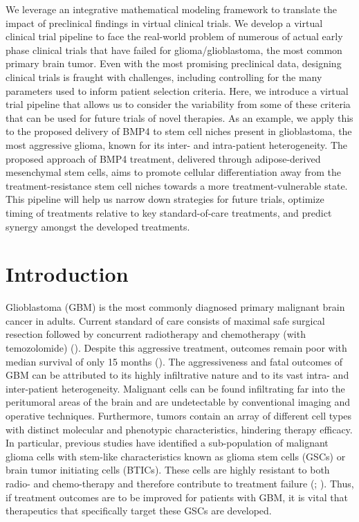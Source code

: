\documentclass[
  letterpaper,
]{scrreprt}
\theoremstyle{definition}
\theoremstyle{remark}
\begin{document}
We leverage an integrative mathematical modeling framework to translate
the impact of preclinical findings in virtual clinical trials. We
develop a virtual clinical trial pipeline to face the real-world problem
of numerous of actual early phase clinical trials that have failed for
glioma/glioblastoma, the most common primary brain tumor. Even with the
most promising preclinical data, designing clinical trials is fraught
with challenges, including controlling for the many parameters used to
inform patient selection criteria. Here, we introduce a virtual trial
pipeline that allows us to consider the variability from some of these
criteria that can be used for future trials of novel therapies. As an
example, we apply this to the proposed delivery of BMP4 to stem cell
niches present in glioblastoma, the most aggressive glioma, known for
its inter- and intra-patient heterogeneity. The proposed approach of
BMP4 treatment, delivered through adipose-derived mesenchymal stem
cells, aims to promote cellular differentiation away from the
treatment-resistance stem cell niches towards a more
treatment-vulnerable state. This pipeline will help us narrow down
strategies for future trials, optimize timing of treatments relative to
key standard-of-care treatments, and predict synergy amongst the
developed treatments.

\hfill\break

\section{Introduction}\label{sec-introduction}

Glioblastoma (GBM) is the most commonly diagnosed primary malignant
brain cancer in adults. Current standard of care consists of maximal
safe surgical resection followed by concurrent radiotherapy and
chemotherapy (with temozolomide) (). Despite this aggressive treatment, outcomes remain poor with
median survival of only 15 months (). The aggressiveness and fatal outcomes of GBM can be
attributed to its highly infiltrative nature and to its vast intra- and
inter-patient heterogeneity. Malignant cells can be found infiltrating
far into the peritumoral areas of the brain and are undetectable by
conventional imaging and operative techniques. Furthermore, tumors
contain an array of different cell types with distinct molecular and
phenotypic characteristics, hindering therapy efficacy. In particular,
previous studies have identified a sub-population of malignant glioma
cells with stem-like characteristics known as glioma stem cells (GSCs)
or brain tumor initiating cells (BTICs). These cells are highly
resistant to both radio- and chemo-therapy and therefore contribute to
treatment failure (;
). Thus, if treatment
outcomes are to be improved for patients with GBM, it is vital that
therapeutics that specifically target these GSCs are developed.
\end{document}
